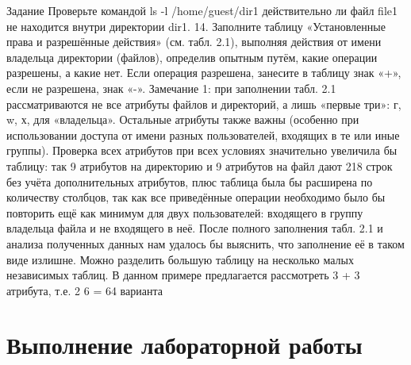 \documentclass[
  ignorenonframetext,
  aspectratio=169,
  russian,
]{beamer}
\begin{document}
\begin{frame}{Задание}
Проверьте командой ls -l /home/guest/dir1 действительно ли файл file1 не
находится внутри директории dir1. 14. Заполните таблицу «Установленные
права и разрешённые действия» (см. табл. 2.1), выполняя действия от
имени владельца директории (файлов), определив опытным путём, какие
операции разрешены, а какие нет. Если операция разрешена, занесите в
таблицу знак «+», если не разрешена, знак «-». Замечание 1: при
заполнении табл. 2.1 рассматриваются не все атрибуты файлов и
директорий, а лишь «первые три»: г, w, х, для «владельца». Остальные
атрибуты также важны (особенно при использовании доступа от имени разных
пользователей, входящих в те или иные группы). Проверка всех атрибутов
при всех условиях значительно увеличила бы таблицу: так 9 атрибутов на
директорию и 9 атрибутов на файл дают 218 строк без учёта дополнительных
атрибутов, плюс таблица была бы расширена по количеству столбцов, так
как все приведённые операции необходимо было бы повторить ещё как
минимум для двух пользователей: входящего в группу владельца файла и не
входящего в неё. После полного заполнения табл. 2.1 и анализа полученных
данных нам удалось бы выяснить, что заполнение её в таком виде излишне.
Можно разделить большую таблицу на несколько малых независимых таблиц. В
данном примере предлагается рассмотреть 3 + 3 атрибута, т.е. 2 6 = 64
варианта
\end{frame}

\section{Выполнение лабораторной
работы}\label{ux432ux44bux43fux43eux43bux43dux435ux43dux438ux435-ux43bux430ux431ux43eux440ux430ux442ux43eux440ux43dux43eux439-ux440ux430ux431ux43eux442ux44b}
\end{document}

